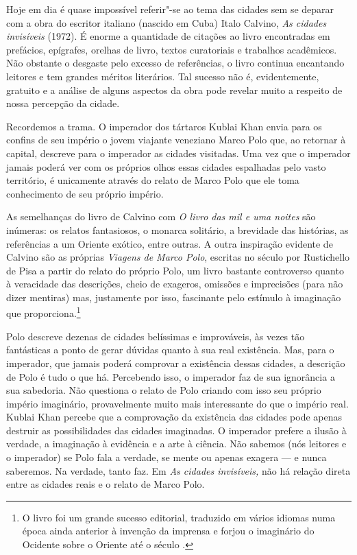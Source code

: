 Hoje em dia é quase impossível referir"-se ao tema das cidades sem se
deparar com a obra do escritor italiano (nascido em Cuba) Italo Calvino,
\emph{As cidades invisíveis} (1972). É enorme a quantidade de citações
ao livro encontradas em prefácios, epígrafes, orelhas de livro, textos
curatoriais e trabalhos acadêmicos. Não obstante o desgaste pelo excesso
de referências, o livro continua encantando leitores e tem grandes
méritos literários. Tal sucesso não é, evidentemente, gratuito e a
análise de alguns aspectos da obra pode revelar muito a respeito de
nossa percepção da cidade.

Recordemos a trama. O imperador dos tártaros Kublai Khan envia para os
confins de seu império o jovem viajante veneziano Marco Polo que, ao
retornar à capital, descreve para o imperador as cidades visitadas. Uma
vez que o imperador jamais poderá ver com os próprios olhos essas
cidades espalhadas pelo vasto território, é unicamente através do relato
de Marco Polo que ele toma conhecimento de seu próprio império.

As semelhanças do livro de Calvino com \emph{O livro das mil e uma
noites} são inúmeras: os relatos fantasiosos, o monarca solitário, a
brevidade das histórias, as referências a um Oriente exótico, entre
outras. A outra inspiração evidente de Calvino são as próprias
\emph{Viagens de Marco Polo}, escritas no século  por Rustichello de
Pisa a partir do relato do próprio Polo, um livro bastante controverso
quanto à veracidade das descrições, cheio de exageros, omissões e
imprecisões (para não dizer mentiras) mas, justamente por isso,
fascinante pelo estímulo à imaginação que proporciona.\footnote{O livro foi um
  grande sucesso editorial, traduzido em vários idiomas numa época
  ainda anterior à invenção da imprensa e forjou o imaginário do Ocidente sobre o Oriente até o século .}

Polo descreve dezenas de cidades belíssimas e improváveis, às vezes tão
fantásticas a ponto de gerar dúvidas quanto à sua real existência. Mas,
para o imperador, que jamais poderá comprovar a existência dessas
cidades, a descrição de Polo é tudo o que há. Percebendo isso, o
imperador faz de sua ignorância a sua sabedoria. Não questiona o relato
de Polo criando com isso seu próprio império imaginário, provavelmente
muito mais interessante do que o império real. Kublai Khan percebe que a
comprovação da existência das cidades pode apenas destruir as
possibilidades das cidades imaginadas. O imperador prefere a ilusão à verdade, a imaginação à evidência e a arte à ciência. Não sabemos (nós leitores e o
imperador) se Polo fala a verdade, se mente ou apenas exagera --- e nunca
saberemos. Na verdade, tanto faz. Em \emph{As cidades invisíveis,} não
há relação direta entre as cidades reais e o relato de Marco Polo.

